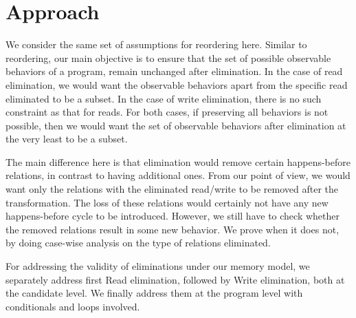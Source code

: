 \section{Approach}

    We consider the same set of assumptions for reordering here. 
    Similar to reordering, our main objective is to ensure that the set of possible observable behaviors of a program, remain unchanged after elimination. 
    In the case of read elimination, we would want the observable behaviors apart from the specific read eliminated to be a subset.
    In the case of write elimination, there is no such constraint as that for reads.
    For both cases, if preserving all behaviors is not possible, then we would want the set of observable behaviors after elimination at the very least to be a subset.

    The main difference here is that elimination would remove certain happens-before relations, in contrast to having additional ones.
    From our point of view, we would want only the relations with the eliminated read/write to be removed after the transformation.
    The loss of these relations would certainly not have any new happens-before cycle to be introduced. 
    However, we still have to check whether the removed relations result in some new behavior. 
    We prove when it does not, by doing case-wise analysis on the type of relations eliminated.  

    For addressing the validity of eliminations under our memory model, we separately address first Read elimination, followed by Write elimination, both at the candidate level. 
    We finally address them at the program level with conditionals and loops involved. 